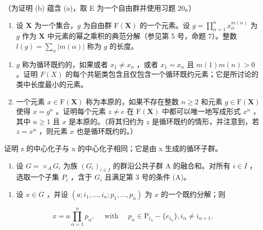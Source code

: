 （为证明 (b) 蕴含 (a)，取 E 为一个自由群并使用习题 20。）

\begin{enumerate}
\def\labelenumi{\arabic{enumi}.}
\setcounter{enumi}{25}
\tightlist
\item
  设 \(\mathbf{X}\) 为一个集合，\(g\) 为自由群 \(\mathrm{F}(\mathbf{X})\) 的一个元素。设 \(g = \prod_{\alpha=1}^{n} x_{\alpha}^{m(\alpha)}\) 为 \(g\) 作为 \(\mathbf{X}\) 中元素的幂之乘积的典范分解（参见第 5 号，命题 7）。整数 \(l(g) = \sum_{\alpha} |m(\alpha)|\) 称为 \(g\) 的长度。
\end{enumerate}

\begin{enumerate}
\def\labelenumi{(\alph{enumi})}
\item
  \(g\) 称为循环既约的，如果或者 \(x_{1} \neq x_{n}\) ，或者 \(x_{1} = x_{n}\) 且 \(m(1)m(n) > 0\) 。证明 \(F(X)\) 的每个共轭类包含且仅包含一个循环既约元素；它是所讨论的类中长度最小的元素。
\item
  一个元素 \(x \in \mathrm{F}(\mathbf{X})\) 称为本原的，如果不存在整数 \(n \geqslant 2\) 和元素 \(g \in \mathrm{F}(\mathbf{X})\) 使得 \(x = g^n\) 。证明每个元素 \(z \neq e\) 在 \(\mathrm{F}(\mathbf{X})\) 中都可以唯一地写成形式 \(x^n\) ，其中 \(n \geqslant 1\) 且 \(x\) 是本原的。（将其归约为 \(z\) 是循环既约的情形，并注意到，若 \(z = x^n\) ，则元素 \(x\) 也是循环既约的。）
\end{enumerate}

证明 z 的中心化子与 x 的中心化子相同；它是由 x 生成的循环子群。

\begin{enumerate}
\def\labelenumi{\arabic{enumi}.}
\setcounter{enumi}{26}
\tightlist
\item
  设 \(G = \times_{A} G_{i}\) 为族 \((G_{i})_{i \in I}\) 的群沿公共子群 A 的融合和。对所有 \(i \in I\) ，选取一个子集 \(P_{i}\) ，含于 \(G_{i}\) 且满足第 3 号的条件 (A)。
\end{enumerate}

\begin{enumerate}
\def\labelenumi{(\alph{enumi})}
\tightlist
\item
  设 \(x \in G\) ，并设 \((a; i_1, \ldots, i_n; p_1, \ldots, p_n)\) 为 \(x\) 的一个既约分解；则
\end{enumerate}

\[
x = a \prod_ {\alpha = 1} ^ {n} p _ {\alpha}, \quad \text { with } \quad p _ {\alpha} \in \mathrm{P} _ {i _ {\alpha}} - \{e _ {i _ {\alpha}} \}, i _ {\alpha} \neq i _ {\alpha + 1}.
\]

